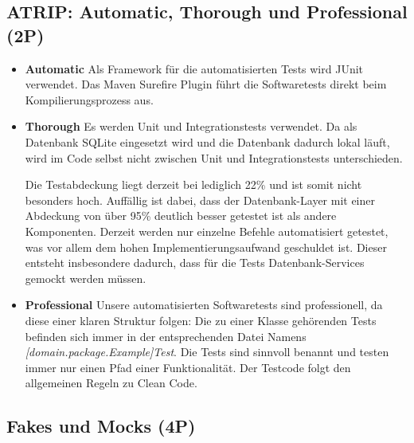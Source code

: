 \subsection{ATRIP: Automatic, Thorough und Professional (2P)}
\begin{itemize}
    \item \textbf{Automatic}\newline 
Als Framework für die automatisierten Tests wird JUnit verwendet. Das Maven Surefire Plugin führt die Softwaretests direkt beim Kompilierungsprozess aus. 
    \item \textbf{Thorough}\newline 
Es werden Unit und Integrationstests verwendet. Da als Datenbank SQLite eingesetzt wird und die Datenbank dadurch lokal läuft, wird im Code selbst nicht zwischen Unit und Integrationstests unterschieden.  

Die Testabdeckung liegt derzeit bei lediglich 22\% und ist somit nicht besonders hoch. Auffällig ist dabei, dass der Datenbank-Layer mit einer Abdeckung von über 95\% deutlich besser getestet ist als andere Komponenten. Derzeit werden nur einzelne Befehle automatisiert getestet, was vor allem dem hohen Implementierungsaufwand geschuldet ist. Dieser entsteht insbesondere dadurch, dass für die Tests Datenbank-Services gemockt werden müssen.
 
    \item \textbf{Professional}\newline 
Unsere automatisierten Softwaretests sind professionell, da diese einer klaren Struktur folgen: Die zu einer Klasse gehörenden Tests befinden sich immer in der entsprechenden Datei Namens \textit{[domain.package.Example]Test}. Die Tests sind sinnvoll benannt und testen immer nur einen Pfad einer Funktionalität. Der Testcode folgt den allgemeinen Regeln zu Clean Code.
\end{itemize}


\subsection{Fakes und Mocks (4P)}

